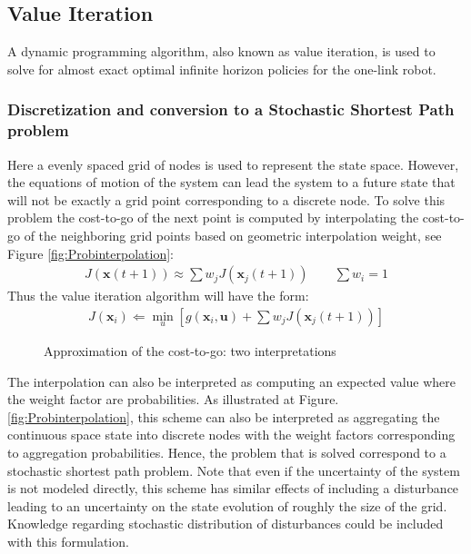 \subsection{Value Iteration}
\label{sec:VI}

A dynamic programming algorithm, also known as value iteration, is used to solve for almost exact optimal infinite horizon policies for the one-link robot. %

\subsubsection{Discretization and conversion to a Stochastic Shortest Path problem}
\label{sec:ConvertionToAStocasticShortestPathProblem}

Here a evenly spaced grid of nodes is used to represent the state space. However, the equations of motion of the system can lead the system to a future state that will not be exactly a grid point corresponding to a discrete node. To solve this problem the cost-to-go of the next point is computed by interpolating the cost-to-go of the neighboring grid points based on geometric interpolation weight, see Figure \ref{fig:Probinterpolation}:
%
\begin{align}
	J(\boldsymbol{x}(t+1)) \approx \sum{ w_j J(\boldsymbol{x}_j(t+1)) }  \quad \quad \sum{ w_i  } = 1
	\label{eq:interpol}
\end{align}
%
Thus the value iteration algorithm will have the form:
%
\begin{align}
	J(\boldsymbol{x}_i) \Leftarrow \min_u{\left[ g(\boldsymbol{x}_i,\boldsymbol{u}) + \sum{ w_j J(\boldsymbol{x}_j(t+1))}  \right]}
	\label{eq:interpol}
\end{align}
%
\begin{figure}[htp]
        \centering
       \caption{Approximation of the cost-to-go: two interpretations }
			\label{fig:aaa}
\end{figure}
%
The interpolation can also be interpreted as computing an expected value where the weight factor are probabilities. As illustrated at Figure. \ref{fig:Probinterpolation}, this scheme can also be interpreted as aggregating the continuous space state into discrete nodes with the weight factors corresponding to aggregation probabilities. Hence, the problem that is solved correspond to a stochastic shortest path problem. Note that even if the uncertainty of the system is not modeled directly, this scheme has similar effects of including a disturbance leading to an uncertainty on the state evolution of roughly the size of the grid. Knowledge regarding stochastic distribution of disturbances could be included with this formulation. 


